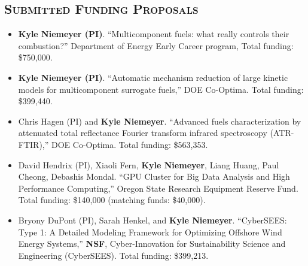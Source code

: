 \documentclass[margin,line,11pt]{res}
\begin{document}
\begin{resume}
%

\section{\textsc{Submitted Funding Proposals}}

\begin{itemize}[leftmargin=*]

\item \textbf{Kyle Niemeyer (PI)}.
``Multicomponent fuels: what really controls their combustion?''
Department of Energy Early Career program,
Total funding: \$750,000.

\item \textbf{Kyle Niemeyer (PI)}.
``Automatic mechanism reduction of large kinetic models for multicomponent surrogate fuels,''
DOE Co-Optima.
Total funding: \$399,440.

\item Chris Hagen (PI) and \textbf{Kyle Niemeyer}.
``Advanced fuels characterization by attenuated total reflectance Fourier transform infrared spectroscopy (ATR-FTIR),''
DOE Co-Optima.
Total funding: \$563,353.

\item David Hendrix (PI), Xiaoli Fern, \textbf{Kyle Niemeyer}, Liang Huang, Paul Cheong, Debashis Mondal.
``GPU Cluster for Big Data Analysis and High Performance Computing,''
Oregon State Research Equipment Reserve Fund.
Total funding: \$140,000 (matching funds: \$40,000).

\item Bryony DuPont (PI), Sarah Henkel, and \textbf{Kyle Niemeyer}.
``CyberSEES: Type 1: A Detailed Modeling Framework for Optimizing Offshore Wind Energy Systems,''
\textbf{NSF}, Cyber-Innovation for Sustainability Science and Engineering (CyberSEES).
Total funding: \$399,213.


\end{itemize}
\end{resume}
\end{document}
